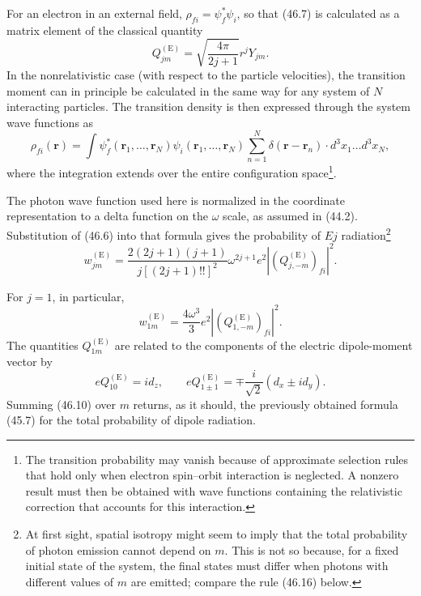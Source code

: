 For an electron in an external field, $\rho_{fi}=\psi_f^*\psi_i$, so that (46.7) is calculated as a matrix element of the classical quantity
\[
Q_{jm}^{(\mathrm E)}=\sqrt{\frac{4\pi}{2j+1}}r^jY_{jm}.
\]
In the nonrelativistic case (with respect to the particle velocities), the transition moment can in principle be calculated in the same way for any system of $N$ interacting particles. The transition density is then expressed through the system wave functions as
\begin{equation}
\rho_{fi}(\mathbf r)=\int\psi_f^*(\mathbf r_1,\ldots,\mathbf r_N)
\psi_i(\mathbf r_1,\ldots,\mathbf r_N)
\sum_{n=1}^N\delta(\mathbf r-\mathbf r_n)\cdot d^3x_1\ldots d^3x_N,
\tag{46.8}
\end{equation}
where the integration extends over the entire configuration space\footnote{The transition probability may vanish because of approximate selection rules that hold only when electron spin--orbit interaction is neglected. A nonzero result must then be obtained with wave functions containing the relativistic correction that accounts for this interaction.}.

The photon wave function used here is normalized in the coordinate representation to a delta function on the $\omega$ scale, as assumed in (44.2). Substitution of (46.6) into that formula gives the probability of $Ej$ radiation\footnote{At first sight, spatial isotropy might seem to imply that the total probability of photon emission cannot depend on $m$. This is not so because, for a fixed initial state of the system, the final states must differ when photons with different values of $m$ are emitted; compare the rule (46.16) below.}
\begin{equation}
w_{jm}^{(\mathrm E)}=\frac{2(2j+1)(j+1)}{j[(2j+1)!!]^2}
\omega^{2j+1}e^2|(Q_{j,-m}^{(\mathrm E)})_{fi}|^2.
\tag{46.9}
\end{equation}

For $j=1$, in particular,
\begin{equation}
w_{1m}^{(\mathrm E)}=\frac{4\omega^3}{3}e^2|(Q_{1,-m}^{(\mathrm E)})_{fi}|^2.
\tag{46.10}
\end{equation}
The quantities $Q_{1m}^{(\mathrm E)}$ are related to the components of the electric dipole-moment vector by
\begin{equation}
eQ_{10}^{(\mathrm E)}=id_z,
\qquad
eQ_{1\pm1}^{(\mathrm E)}=\mp\frac{i}{\sqrt2}(d_x\pm id_y).
\tag{46.11}
\end{equation}
Summing (46.10) over $m$ returns, as it should, the previously obtained formula (45.7) for the total probability of dipole radiation.

